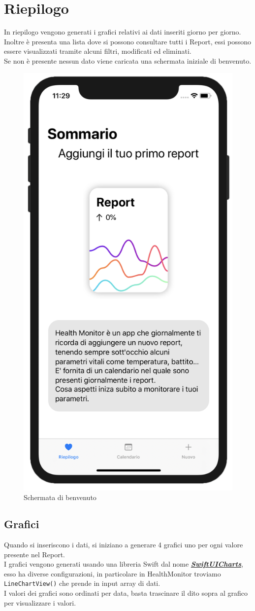 \documentclass{article}
\begin{document}

\newpage
\section{Riepilogo}

In riepilogo vengono generati i grafici relativi ai dati inseriti giorno per giorno. Inoltre è presenta una lista dove si possono consultare tutti i Report, essi  possono essere visualizzati tramite alcuni filtri, modificati ed eliminati.\\
Se non è presente nessun dato viene caricata una schermata iniziale di benvenuto. 

\begin{figure}[htp]

\centering
\includegraphics[width=.15\textwidth]{img/riepilogo_iniziale.png}

\caption{Schermata di benvenuto}
\label{fig:figure2}
\end{figure}

\subsection{Grafici}

Quando si inseriscono i dati, si iniziano a generare 4 grafici uno per ogni valore presente nel Report.\\
I grafici vengono generati usando una libreria Swift dal nome \textbf{\textit{\href{https://github.com/AppPear/ChartView}{SwiftUICharts}}}, esso ha diverse configurazioni, in particolare in HealthMonitor troviamo \texttt{LineChartView()} che prende in input array di dati.\\
I valori dei grafici sono ordinati per data, basta trascinare il dito sopra al grafico per visualizzare i valori. 
\end{document}

